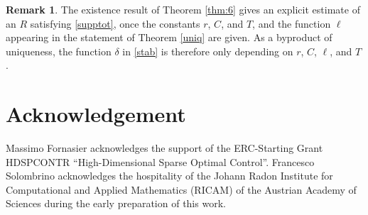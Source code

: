 \documentclass[11pt]{article}
\theoremstyle{plain}
\theoremstyle{definition}
\newtheorem{remark}[theorem]{Remark}
\theoremstyle{remark}
\numberwithin{equation}{section}
\begin{document}
\begin{remark}
The existence result of Theorem \ref{thm:6} gives an explicit estimate of an $R$ satisfying \eqref{supptot}, once the constants $r$, $C$, and $T$, and the function $\ell$ appearing in the statement of Theorem \ref{uniq} are given. As a byproduct of uniqueness, the function $\delta$ in \eqref{stab} is therefore only depending on $r$, $C$, $\ell$, and $T$.
\end{remark}


\section*{Acknowledgement}

Massimo Fornasier  acknowledges the support of the ERC-Starting Grant HDSPCONTR ``High-Dimensional Sparse Optimal Control''. 
Francesco Solombrino acknowledges the hospitality of the Johann Radon Institute for Computational and Applied Mathematics (RICAM) of the Austrian Academy of Sciences 
during the early preparation of this work.


\end{document}
